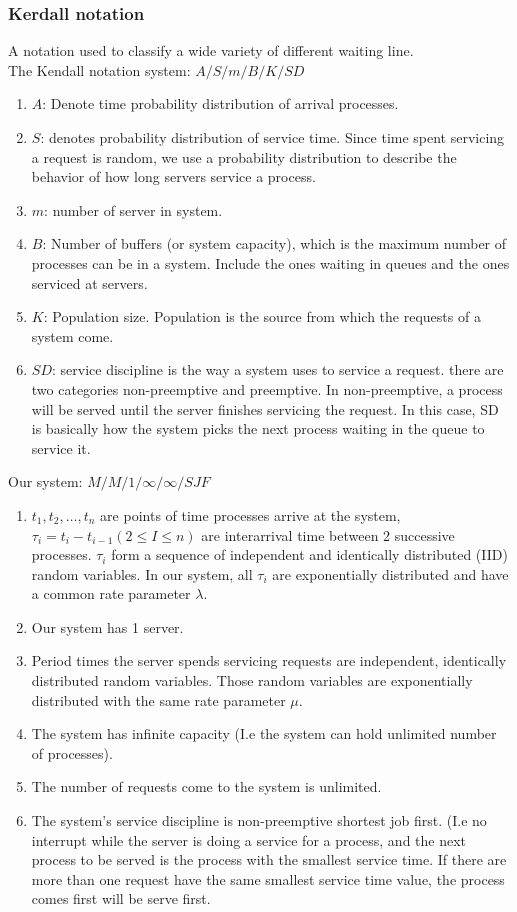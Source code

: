 \documentclass[13pt,a4paper]{article}
\begin{document}
			\subsubsection{Kerdall notation}
				A notation used to classify a wide variety of different waiting line. \\
				The Kendall notation system: $A/S/m/B/K/SD$ \\
				\begin{enumerate}[-]
					\item $A$: Denote time probability distribution of arrival processes. 
					\item $S$: denotes probability distribution of service time. Since time spent servicing a request is random, we use a probability distribution to describe the behavior of how long servers service a process.
					\item $m$: number of server in system.
					\item $B$: Number of buffers (or system capacity), which is the maximum number of processes can be in a system. Include the ones waiting in queues and the ones serviced at servers.
					\item $K$: Population size. Population is the source from which the requests of a system come.
					\item $SD$: service discipline is the way a system uses to service a request. there are two categories non-preemptive and preemptive. In non-preemptive, a process will be served until the server finishes servicing the request. In this case, SD is basically how the system picks the next process waiting in the queue to service it.
				\end{enumerate}
				Our system: $M/M/1/\infty/\infty/SJF$
				\begin{enumerate}[-]
					\item $t_1, t_2, …, t_n$ are points of time processes arrive at the system, $\tau_i = t_i - t_{i-1} (2 \leqslant I \leqslant n)$ are interarrival time between 2 successive processes. $\tau_i$ form a sequence of independent and identically distributed (IID) random variables.  In our system, all $\tau_i$ are exponentially distributed and have a common rate parameter $\lambda$.
					\item Our system has 1 server.
					\item Period times the server spends servicing requests are independent, identically distributed random variables. Those random variables are exponentially distributed with the same rate parameter $\mu$.
					\item The system has infinite capacity (I.e the system can hold unlimited number of processes).
					\item The number of requests come to the system is unlimited.
					\item The system’s service discipline is non-preemptive shortest job first. (I.e no interrupt while the server is doing a service for a process, and the next process to be served is the process with the smallest service time. If there are more than one request have the same smallest service time value, the process comes first will be serve first.
				\end{enumerate}
\end{document}
